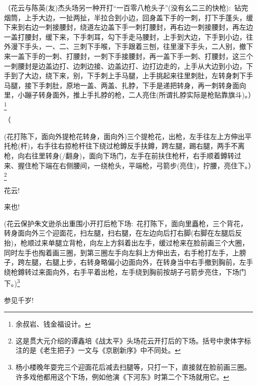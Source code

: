 {（{花云与陈英(友)杰头场另一种开打``一百零八枪头子''}({没有幺二三的快枪}):~钻完烟筒，上手大边，一扯两扯，半拉合到小边，回身盖下手的一刺，打下手蓬头，缓下来到右边一刺接腰封，绕道左边盖下手一刺打腰封，再右边一刺接腰封，再左边一盖打腰封，缓下来，下手刺耳，勾下手走马腰封，上手到大边，下手到小边，往外漫下手头，一、二、三刺下手喉，下手跟着三刨，往里漫下手头，二人别，撤下来一盖下手的一刺、打腰封，一刺下手接腰封，再一盖下手一刺、打腰封，这三个一刺腰封是边盖边打、边刺边接、边盖边打、边打边走的，上手从大边到小边，下手到了大边，绕下来，别，下手刺上手马腿，上手挑起来往里刺肚，左转身刺下手马腿，接下手刺肚，原地一盖、两盖、扎脖，下手是递把转身，再一刺转身面向里，小蹦子转身面外，推上手扎脖的枪，二人亮住(所谓扎脖实际是枪贴靠旗斗)。）\footnote{余叔岩、钱金福设计。}

（\hspace{40pt}~

(花打陈下，面向外提枪花转身，面向外)三个提枪花，出枪，左手往左上方伸出平托枪(杆)，右手往右掠枪杆往下绕过枪鐏反手扶鐏，跨左腿，踢右腿，两手不离枪，向右往里转身(/翻身)，面向下场门，左手在前扶住枪杆，右手顺着鐏转过来、握住枪下端在右侧腰间，一绕枪头，平端枪，弓箭步(亮住)，拧腰，亮住下。）\footnote{这是贯大元介绍的谭鑫培《战太平》头场花云开打后的下场。括号中隶体字标注的是《老生把子》一文与《京剧新序》中不同处。}

{\vspace{5pt}}

{花云!}\hspace{40pt}~

{来也!}\hspace{40pt}~

({花云保护朱文逊杀出重围小开打后枪下场:~}花打陈下，面向里矗枪，三个背花，转身面向外三个迎面花，扫左腿，扫右腿，在左边向后打右脚(右脚在左腿后反抬)，枪顺过来单腿立背枪，向左上方斜着出左手，缓过枪来在脸前画三个大圈，同时左手也掏着画三圈，到第三圈左手向左斜上方伸出去，右手枪打左手，上膀子，跨左腿，右腿上步，右转身略偏小边面向外，在转身当中右手撤到胸前，左手绕枪鐏转过来面向外，右手平着出枪，左手绕到胸前按胡子弓箭步亮住，下场门下。)\footnote{杨小楼晚年耍完三个迎面花后减去扫腿等，只打一下，直接就在脸前画三圈。许多戏他都用这个下场，例如他演《下河东》时第二个下场就用它。}

{\vspace{5pt}}

{参见千岁!}\hspace{30pt}~

}

